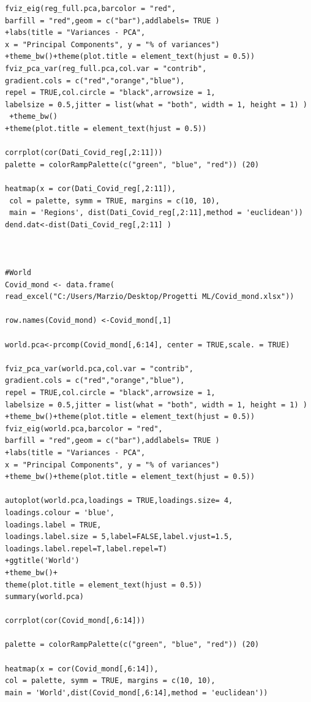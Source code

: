 \documentclass[
12pt, %
a4paper, %
oneside, %
headinclude,footinclude, %
BCOR5mm, %
]{scrartcl}
\begin{document}
\begin{lstlisting}
fviz_eig(reg_full.pca,barcolor = "red",
barfill = "red",geom = c("bar"),addlabels= TRUE )
+labs(title = "Variances - PCA",
x = "Principal Components", y = "% of variances")
+theme_bw()+theme(plot.title = element_text(hjust = 0.5))
fviz_pca_var(reg_full.pca,col.var = "contrib",
gradient.cols = c("red","orange","blue"),
repel = TRUE,col.circle = "black",arrowsize = 1,
labelsize = 0.5,jitter = list(what = "both", width = 1, height = 1) )
 +theme_bw()
+theme(plot.title = element_text(hjust = 0.5))

corrplot(cor(Dati_Covid_reg[,2:11]))
palette = colorRampPalette(c("green", "blue", "red")) (20)

heatmap(x = cor(Dati_Covid_reg[,2:11]),
 col = palette, symm = TRUE, margins = c(10, 10),
 main = 'Regions', dist(Dati_Covid_reg[,2:11],method = 'euclidean'))
dend.dat<-dist(Dati_Covid_reg[,2:11] )



#World
Covid_mond <- data.frame(
read_excel("C:/Users/Marzio/Desktop/Progetti ML/Covid_mond.xlsx"))

row.names(Covid_mond) <-Covid_mond[,1]

world.pca<-prcomp(Covid_mond[,6:14], center = TRUE,scale. = TRUE)

fviz_pca_var(world.pca,col.var = "contrib",
gradient.cols = c("red","orange","blue"),
repel = TRUE,col.circle = "black",arrowsize = 1,
labelsize = 0.5,jitter = list(what = "both", width = 1, height = 1) ) 
+theme_bw()+theme(plot.title = element_text(hjust = 0.5)) 
fviz_eig(world.pca,barcolor = "red",
barfill = "red",geom = c("bar"),addlabels= TRUE )
+labs(title = "Variances - PCA",
x = "Principal Components", y = "% of variances")
+theme_bw()+theme(plot.title = element_text(hjust = 0.5))

autoplot(world.pca,loadings = TRUE,loadings.size= 4,
loadings.colour = 'blue',
loadings.label = TRUE,
loadings.label.size = 5,label=FALSE,label.vjust=1.5,
loadings.label.repel=T,label.repel=T)
+ggtitle('World')
+theme_bw()+
theme(plot.title = element_text(hjust = 0.5)) 
summary(world.pca)

corrplot(cor(Covid_mond[,6:14]))

palette = colorRampPalette(c("green", "blue", "red")) (20)

heatmap(x = cor(Covid_mond[,6:14]), 
col = palette, symm = TRUE, margins = c(10, 10),
main = 'World',dist(Covid_mond[,6:14],method = 'euclidean'))

\end{lstlisting}




\renewcommand{\refname}{\spacedlowsmallcaps{References}} %




\end{document}
